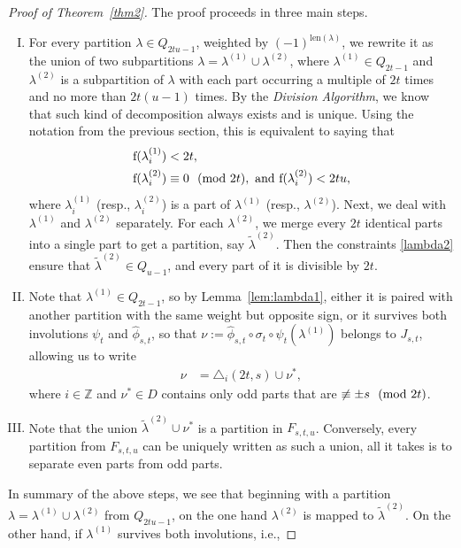 \documentclass[12pt,reqno]{amsart}
\numberwithin{equation}{section}
\newcommand{\len}{\mathrm{len}}
\newcommand{\f}{\mathrm{f}}
\def\bZ{\mathbb{Z}}
\newcommand{\tpmod}[1]{\mkern 12mu(\textup{mod}\mkern 6mu #1)}
\begin{document}
\begin{proof}[Proof of Theorem~\ref{thm2}]
The proof proceeds in three main steps. 
\begin{enumerate}[I.]
	\item For every partition $\lambda\in Q_{2tu-1}$, weighted by $(-1)^{\len(\lambda)}$, we rewrite it as the union of two subpartitions $\lambda=\lambda^{(1)}\cup\lambda^{(2)}$, where $\lambda^{(1)}\in Q_{2t-1}$ and $\lambda^{(2)}$ is a subpartition of $\lambda$ with each part occurring a multiple of $2t$ times and no more than $2t(u-1)$ times. By the \emph{Division Algorithm}, we know that such kind of decomposition always exists and is unique. Using the notation from the previous section, this is equivalent to saying that
\begin{align}
	\f(\lambda^{(1)}_i) & <2t,\nonumber \\
	\f(\lambda^{(2)}_i) & \equiv 0 \tpmod{2t}, \text{ and } \f(\lambda^{(2)}_i)<2tu, \label{lambda2}
\end{align}
where $\lambda^{(1)}_i$ (resp., $\lambda^{(2)}_i$) is a part of $\lambda^{(1)}$ (resp., $\lambda^{(2)}$). Next, we deal with $\lambda^{(1)}$ and $\lambda^{(2)}$ separately. For each $\lambda^{(2)}$, we merge every $2t$ identical parts into a single part to get a partition, say $\tilde{\lambda}^{(2)}$. Then the constraints \eqref{lambda2} ensure that $\tilde{\lambda}^{(2)}\in Q_{u-1}$, and every part of it is divisible by $2t$.
	\item Note that $\lambda^{(1)}\in Q_{2t-1}$, so by Lemma~\ref{lem:lambda1}, either it is paired with another partition with the same weight but opposite sign, or it survives both involutions $\psi_t$ and $\hat{\phi}_{s,t}$, so that $\nu:=\hat{\phi}_{s,t}\circ\sigma_t\circ\psi_t(\lambda^{(1)})$ belongs to $J_{s,t}$, allowing us to write
	\begin{align*}
	\nu &= \triangle_i(2t,s)\cup \nu^*,
	\end{align*}
	where $i\in\bZ$ and $\nu^*\in D$ contains only odd parts that are $\not\equiv \pm s\tpmod{2t}$.
	\item Note that the union $\tilde{\lambda}^{(2)}\cup \nu^*$ is a partition in $F_{s,t,u}$. Conversely, every partition from $F_{s,t,u}$ can be uniquely written as such a union, all it takes is to separate even parts from odd parts.
\end{enumerate}
In summary of the above steps, we see that beginning with a partition $\lambda=\lambda^{(1)}\cup\lambda^{(2)}$ from $Q_{2tu-1}$, on the one hand $\lambda^{(2)}$ is mapped to $\tilde{\lambda}^{(2)}$. On the other hand, if $\lambda^{(1)}$ survives both involutions, i.e.,

\end{proof}
\end{document}
